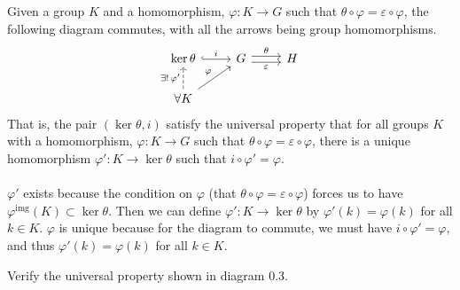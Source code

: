 \documentclass[letterpaper, 12pt]{hmcpset}
\begin{document}
\begin{solution}
	Given a group $K$ and a homomorphism, $\varphi : K \to G$ such that ${\theta \circ \varphi = \varepsilon \circ \varphi}$, the following diagram commutes, with all the arrows being group homomorphisms.
	\[
		\begin{tikzcd}
			\ker \theta \arrow[r, hook, "i"]
				& G \arrow[r, "\theta", shift left] \arrow[r, "\varepsilon"', shift right]
				& H \\
			\forall K  \arrow[u, dashrightarrow, "\exists ! \, \varphi'"] \arrow[ur, "\varphi"]
		\end{tikzcd}
	\]
	That is, the pair $(\ker \theta, i)$ satisfy the universal property that for all groups $K$ with a homomorphism, $\varphi : K \to G$ such that ${\theta \circ \varphi = \varepsilon \circ \varphi}$, there is a unique homomorphism $\varphi' : K \to \ker \theta$ such that $i \circ \varphi' = \varphi$.\\\\
	$\varphi'$ exists because the condition on $\varphi$ (that $\theta \circ \varphi = \varepsilon \circ \varphi$) forces us to have $\varphi^\text{img}(K) \subset \ker \theta$. Then we can define $\varphi' : K \to \ker \theta$ by $\varphi'(k) = \varphi(k)$ for all $k \in K$. $\varphi$ is unique because for the diagram to commute, we must have $i \circ \varphi' = \varphi$, and thus $\varphi'(k) = \varphi(k)$ for all $k \in K$.
\end{solution}

\pagebreak

\begin{problem}[0.12]
	Verify the universal property shown in diagram 0.3.
\end{problem}
\end{document}
